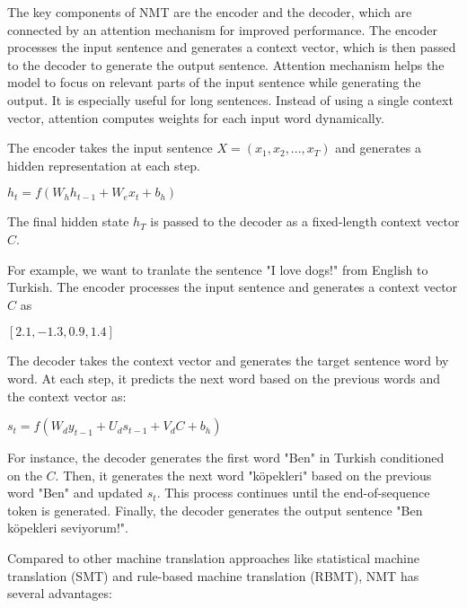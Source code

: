 \documentclass[10pt]{article}
\begin{document}
\begin{description}
The key components of NMT are the encoder and the decoder, which are connected by an attention mechanism for improved performance.
The encoder processes the input sentence and generates a context vector, which is then passed to the decoder to generate the output sentence.
Attention mechanism helps the model to focus on relevant parts of the input sentence while generating the output. It is especially useful for long sentences.
Instead of using a single context vector, attention computes weights for each input word dynamically.

The encoder takes the input sentence $X = (x_1, x_2, ..., x_T)$ and generates a hidden representation at each step.

\begin{center}
    $h_t = f(W_{h}h_{t-1} + W_{e}x_t + b_h)$
\end{center}

The final hidden state $h_T$ is passed to the decoder as a fixed-length context vector $C$.

For example, we want to tranlate the sentence "I love dogs!" from English to Turkish.
The encoder processes the input sentence and generates a context vector $C$ as

\begin{center}
    $[2.1, -1.3, 0.9, 1.4]$
\end{center}

The decoder takes the context vector and generates the target sentence word by word.
At each step, it predicts the next word based on the previous words and the context vector as:

\begin{center}
    $s_t = f(W_{d}y_{t-1} + U_{d}s_{t-1} + V_{d}C + b_h)$
\end{center}

For instance, the decoder generates the first word "Ben" in Turkish conditioned on the $C$.
Then, it generates the next word "köpekleri" based on the previous word "Ben" and updated $s_t$.
This process continues until the end-of-sequence token is generated. 
Finally, the decoder generates the output sentence "Ben köpekleri seviyorum!".

Compared to other machine translation approaches like statistical machine translation (SMT) and rule-based machine translation (RBMT), NMT has several advantages:


\end{description}
\end{document}
